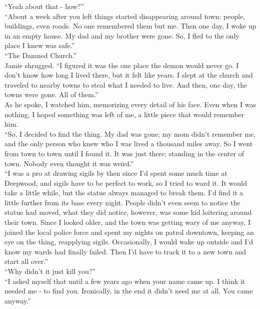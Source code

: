 \documentclass[a5paper]{scrartcl}
\begin{document}
\enquote{Yeah about that - how?}\\


\enquote{About a week after you left things started disappearing around town: people, buildings, even roads. No one remembered them but me. Then one day, I woke up in an empty house. My dad and my brother were gone. So, I fled to the only place I knew was safe.}\\


\enquote{The Damned Church.}\\


Jamie shrugged. \enquote{I figured it was the one place the demon would never go. I don't know how long I lived there, but it felt like years. I slept at the church and traveled to nearby towns to steal what I needed to live. And then, one day, the towns were gone. All of them.}\\


As he spoke, I watched him, memorizing every detail of his face. Even when I was nothing, I hoped something was left of me, a little piece that would remember him.\\


\enquote{So, I decided to find the thing. My dad was gone; my mom didn't remember me, and the only person who knew who I was lived a thousand miles away. So I went from town to town until I found it. It was just there; standing in the center of town. Nobody even thought it was weird.}\\


\enquote{I was a pro at drawing sigils by then since I'd spent some much time at Deepwood, and sigils have to be perfect to work, so I tried to ward it. It would take a little while, but the statue always managed to break them. I'd find it a little further from its base every night. People didn't even seem to notice the statue had moved, what they did notice, however, was some kid loitering around their town.  Since I looked older, and the town was getting wary of me anyway, I joined the local police force and spent my nights on patrol downtown, keeping an eye on the thing, reapplying sigils. Occasionally, I would wake up outside and I'd know my wards had finally failed. Then I'd have to track it to a new town and start all over.}\\


\enquote{Why didn't it just kill you?}\\


\enquote{I asked myself that until a few years ago when your name came up. I think it needed me - to find you. Ironically, in the end it didn't need me at all. You came anyway.}\\
\end{document}
